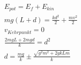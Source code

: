 \hfill
\begin{minipage}[h!]{0.3\linewidth}
	\begin{align*}
	E_{pot} = E_f + E_{kin} \\
	m g (L + d) = \frac{kd^2}{2}  + \frac{m v^2}{2}  \\
	v_{Kehrpunkt} = 0 \\
	\frac{2mgL + 2mgd}{k} = d^2 \\
	d = \frac{m g}{k} \pm \frac{\sqrt{g^2 m^2 + 2 g k L m}}{k} \\
	\end{align*}
\end{minipage}

